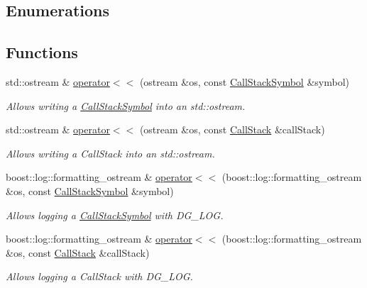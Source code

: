 \subsection*{Enumerations}
\subsection*{Functions}
\begin{DoxyCompactItemize}
\item 
std\+::ostream \& \hyperlink{group___utility_module_gafa131d4872913d78dd09474524e54de3}{operator$<$$<$} (ostream \&os, const \hyperlink{structdg_1_1deepcore_1_1_call_stack_symbol}{Call\+Stack\+Symbol} \&symbol)
\begin{DoxyCompactList}\small\item\em Allows writing a \hyperlink{structdg_1_1deepcore_1_1_call_stack_symbol}{Call\+Stack\+Symbol} into an std\+::ostream. \end{DoxyCompactList}\item 
std\+::ostream \& \hyperlink{group___utility_module_ga0e3995beecca99ed6a56bbd006d778cf}{operator$<$$<$} (ostream \&os, const \hyperlink{group___utility_module_gabdf2d70ae3aab3c57142eddec69a725c}{Call\+Stack} \&call\+Stack)
\begin{DoxyCompactList}\small\item\em Allows writing a Call\+Stack into an std\+::ostream. \end{DoxyCompactList}\item 
boost\+::log\+::formatting\+\_\+ostream \& \hyperlink{group___utility_module_ga97adfcc9f917f8bd42421eaa2d618ef6}{operator$<$$<$} (boost\+::log\+::formatting\+\_\+ostream \&os, const \hyperlink{structdg_1_1deepcore_1_1_call_stack_symbol}{Call\+Stack\+Symbol} \&symbol)
\begin{DoxyCompactList}\small\item\em Allows logging a \hyperlink{structdg_1_1deepcore_1_1_call_stack_symbol}{Call\+Stack\+Symbol} with D\+G\+\_\+\+L\+OG. \end{DoxyCompactList}\item 
boost\+::log\+::formatting\+\_\+ostream \& \hyperlink{group___utility_module_ga34296a075c256c17fe8ba2f1f6d18372}{operator$<$$<$} (boost\+::log\+::formatting\+\_\+ostream \&os, const \hyperlink{group___utility_module_gabdf2d70ae3aab3c57142eddec69a725c}{Call\+Stack} \&call\+Stack)
\begin{DoxyCompactList}\small\item\em Allows logging a Call\+Stack with D\+G\+\_\+\+L\+OG. \end{DoxyCompactList}\item 

\end{DoxyCompactItemize}
